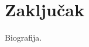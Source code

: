 \documentclass[12pt,oneside]{memoir}
\theoremstyle{definition}
\begin{document}
\chapter{Zaključak}

\literatura

\backmatter

\begin{biografija}
	Biografija.
\end{biografija}
\end{document}
